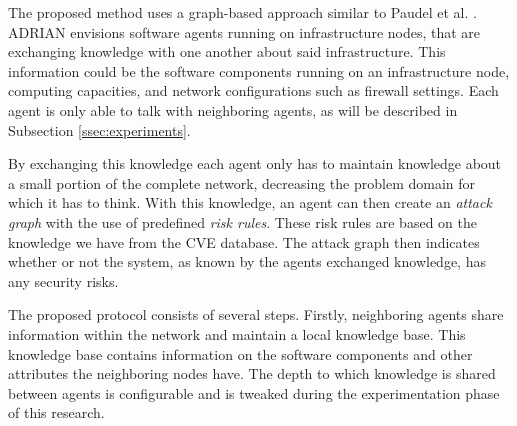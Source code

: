 The proposed method uses a graph-based approach similar to Paudel et al. \cite{paudel2019detecting}. ADRIAN envisions software agents running on infrastructure nodes, that are exchanging knowledge with one another about said infrastructure. This information could be the software components running on an infrastructure node, computing capacities, and network configurations such as firewall settings. Each agent is only able to talk with neighboring agents, as will be described in Subsection \ref{ssec:experiments}.

By exchanging this knowledge each agent only has to maintain knowledge about a small portion of the complete network, decreasing the problem domain for which it has to think. With this knowledge, an agent can then create an \emph{attack graph} with the use of predefined \emph{risk rules}. These risk rules are based on the knowledge we have from the CVE database. The attack graph then indicates whether or not the system, as known by the agents exchanged knowledge, has any security risks.




The proposed protocol consists of several steps. Firstly, neighboring agents share information within the network and maintain a local knowledge base. This knowledge base contains information on the software components and other attributes the neighboring nodes have. The depth to which knowledge is shared between agents is configurable and is tweaked during the experimentation phase of this research.


